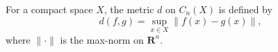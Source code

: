For a compact space $X$, the metric $d$ on $C_n(X)$ is defined by
$$d(f, g) = \sup_{x \in X} \|f(x) - g(x)\|,$$
where $\|\cdot\|$ is the max-norm on $\mathbf{R}^n$.
